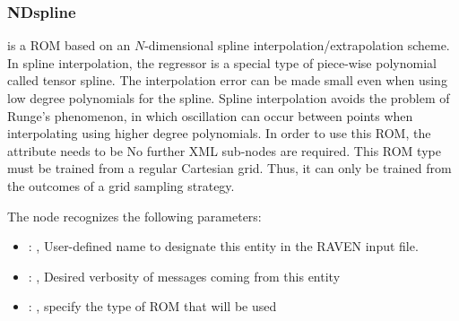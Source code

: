 

\subsubsection{NDspline}
   is a ROM based on an $N$-dimensional                             spline
  interpolation/extrapolation scheme.                             In spline interpolation, the
  regressor is a special type of piece-wise                             polynomial called tensor
  spline.                             The interpolation error can be made small even when using low
  degree polynomials                             for the spline.                             Spline
  interpolation avoids the problem of Runge's phenomenon, in which
  oscillation can occur between points when interpolating using higher degree
  polynomials.                             In order to use this ROM, the  attribute
   needs to                             be 
  No further XML sub-nodes are required.                             \nb This ROM type must be
  trained from a regular Cartesian grid.                             Thus, it can only be trained
  from the outcomes of a grid sampling strategy.

  The  node recognizes the following parameters:
    \begin{itemize}
      \item {}: ,
        User-defined name to designate this entity in the RAVEN input file.
      \item {}: ,
        Desired verbosity of messages coming from this entity
      \item {}: ,
        specify the type of ROM that will be used
  \end{itemize}

